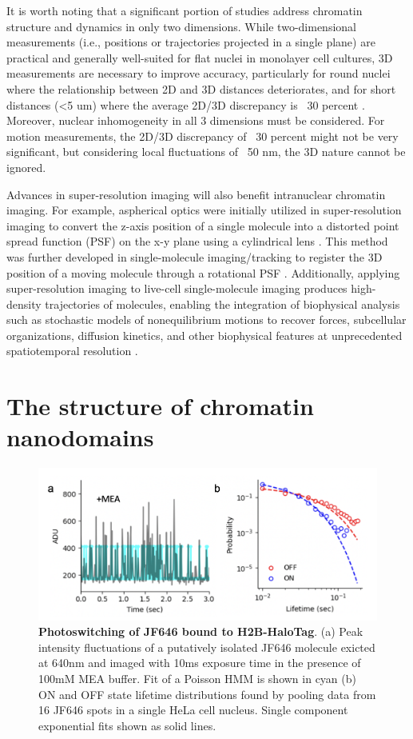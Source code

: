 It is worth noting that a significant portion of studies address chromatin structure and dynamics in only two dimensions. While two-dimensional measurements (i.e., positions or trajectories projected in a single plane) are practical and generally well-suited for flat nuclei in monolayer cell cultures, 3D measurements are necessary to improve accuracy, particularly for round nuclei where the relationship between 2D and 3D distances deteriorates, and for short distances (<5 um) where the average 2D/3D discrepancy is ~30 percent \parencite{Finn2017}. Moreover, nuclear inhomogeneity in all 3 dimensions must be considered. For motion measurements, the 2D/3D discrepancy of ~30 percent might not be very significant, but considering local fluctuations of ~50 nm, the 3D nature cannot be ignored.

Advances in super-resolution imaging will also benefit intranuclear chromatin imaging. For example, aspherical optics were initially utilized in super-resolution imaging to convert the z-axis position of a single molecule into a distorted point spread function (PSF) on the x-y plane using a cylindrical lens \parencite{Huang2008}. This method was further developed in single-molecule imaging/tracking to register the 3D position of a moving molecule through a rotational PSF \parencite{Greengard2006,Pavani2009,Badieirostami2010,Thompson2010}. Additionally, applying super-resolution imaging to live-cell single-molecule imaging produces high-density trajectories of molecules, enabling the integration of biophysical analysis such as stochastic models of nonequilibrium motions to recover forces, subcellular organizations, diffusion kinetics, and other biophysical features at unprecedented spatiotemporal resolution \parencite{Hoze2012,Holcman2015,Hoze2015}.


\section{The structure of chromatin nanodomains}

\begin{figure}[t]
\centering
\includegraphics[width=13cm]{media/Lifetime.png}
\caption{\textbf{Photoswitching of JF646 bound to H2B-HaloTag}. (a) Peak intensity fluctuations of a putatively isolated JF646 molecule exicted at 640nm and imaged with 10ms exposure time in the presence of 100mM MEA buffer. Fit of a Poisson HMM is shown in cyan (b) ON and OFF state lifetime distributions found by pooling data from 16 JF646 spots in a single HeLa cell nucleus. Single component exponential fits shown as solid lines.}
\label{fig:fig16}
\end{figure}


